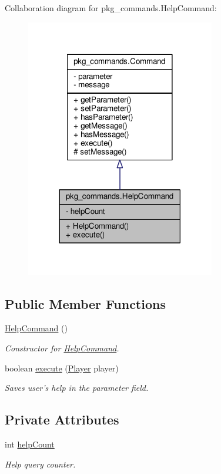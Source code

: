 Collaboration diagram for pkg\-\_\-commands.\-Help\-Command\-:\nopagebreak
\begin{figure}[H]
\begin{center}
\leavevmode
\includegraphics[width=234pt]{classpkg__commands_1_1HelpCommand__coll__graph}
\end{center}
\end{figure}
\subsection*{Public Member Functions}
\begin{DoxyCompactItemize}
\item 
\hyperlink{classpkg__commands_1_1HelpCommand_a5f12eadc1835cd0c7cdb77811b5fb756}{Help\-Command} ()
\begin{DoxyCompactList}\small\item\em Constructor for \hyperlink{classpkg__commands_1_1HelpCommand}{Help\-Command}. \end{DoxyCompactList}\item 
boolean \hyperlink{classpkg__commands_1_1HelpCommand_a332d3e57539dfc82f8c539f8b3e24dd6}{execute} (\hyperlink{classpkg__world_1_1Player}{Player} player)
\begin{DoxyCompactList}\small\item\em Saves user's help in the parameter field. \end{DoxyCompactList}\end{DoxyCompactItemize}
\subsection*{Private Attributes}
\begin{DoxyCompactItemize}
\item 
int \hyperlink{classpkg__commands_1_1HelpCommand_a1f83dd0f92e63803f29ce29485903526}{help\-Count}
\begin{DoxyCompactList}\small\item\em Help query counter. \end{DoxyCompactList}\end{DoxyCompactItemize}
